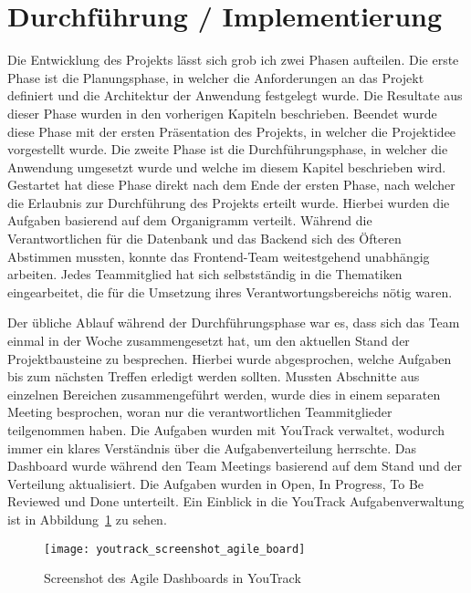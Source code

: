 \section{Durchführung / Implementierung}\label{sec:durchfuehrung-implementierung}

Die Entwicklung des Projekts lässt sich grob ich zwei Phasen aufteilen.
Die erste Phase ist die Planungsphase, in welcher die Anforderungen an das Projekt definiert und die Architektur der Anwendung festgelegt wurde.
Die Resultate aus dieser Phase wurden in den vorherigen Kapiteln beschrieben.
Beendet wurde diese Phase mit der ersten Präsentation des Projekts, in welcher die Projektidee vorgestellt wurde.
Die zweite Phase ist die Durchführungsphase, in welcher die Anwendung umgesetzt wurde und welche im diesem Kapitel beschrieben wird.
Gestartet hat diese Phase direkt nach dem Ende der ersten Phase, nach welcher die Erlaubnis zur Durchführung des Projekts erteilt wurde.
Hierbei wurden die Aufgaben basierend auf dem Organigramm verteilt.
Während die Verantwortlichen für die Datenbank und das Backend sich des Öfteren Abstimmen mussten, konnte das Frontend-Team weitestgehend unabhängig arbeiten.
Jedes Teammitglied hat sich selbstständig in die Thematiken eingearbeitet, die für die Umsetzung ihres Verantwortungsbereichs nötig waren.

Der übliche Ablauf während der Durchführungsphase war es, dass sich das Team einmal in der Woche zusammengesetzt hat, um den aktuellen Stand der Projektbausteine zu besprechen.
Hierbei wurde abgesprochen, welche Aufgaben bis zum nächsten Treffen erledigt werden sollten.
Mussten Abschnitte aus einzelnen Bereichen zusammengeführt werden, wurde dies in einem separaten Meeting besprochen, woran nur die verantwortlichen Teammitglieder teilgenommen haben.
Die Aufgaben wurden mit YouTrack verwaltet, wodurch immer ein klares Verständnis über die Aufgabenverteilung herrschte.
Das Dashboard wurde während den Team Meetings basierend auf dem Stand und der Verteilung aktualisiert.
Die Aufgaben wurden in Open, In Progress, To Be Reviewed und Done unterteilt.
Ein Einblick in die YouTrack Aufgabenverwaltung ist in Abbildung~\ref{fig:youtrack_screenshot_agile_board} zu sehen.

\begin{figure}[h]
    \centering
    \texttt{[image: youtrack\_screenshot\_agile\_board]}
    \caption{Screenshot des Agile Dashboards in YouTrack}
    \label{fig:youtrack_screenshot_agile_board}
\end{figure}

